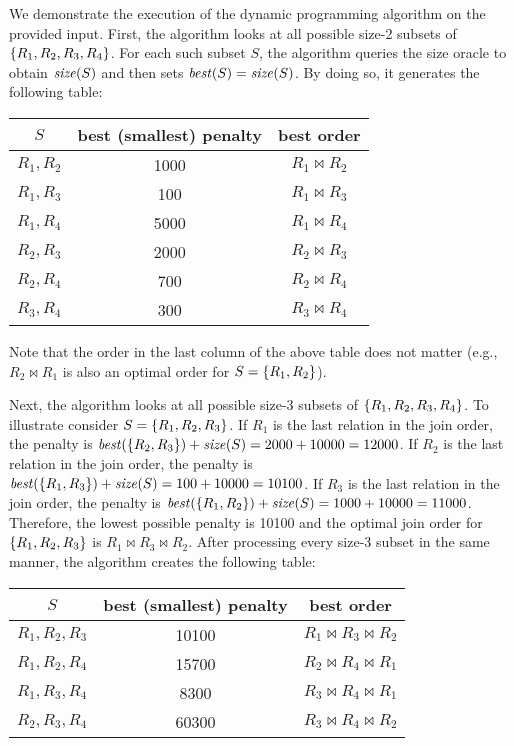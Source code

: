 \begin{sol}
     We demonstrate the execution of the dynamic programming algorithm on the provided input. First, the algorithm looks at all possible size-2 subsets of $\{R_1, R_2, R_3, R_4\}$. For each such subset $S$, the algorithm queries the size oracle to obtain $\mathit{size}(S)$ and then sets $\mathit{best}(S) = \mathit{size}(S)$. By doing so, it generates the following table:

    \begin{center}
    \begin{tabular}{c|c|c}
        $S$ & best (smallest) penalty & best order\\
        \hline
        $R_1,R_2$ & 1000 & $R_1 \bowtie R_2$ \\
        $R_1,R_3$ & 100 & $R_1 \bowtie R_3$\\
        $R_1,R_4$ & 5000 & $R_1 \bowtie R_4$\\
        $R_2,R_3$ & 2000 & $R_2 \bowtie R_3$\\
        $R_2,R_4$ & 700 & $R_2 \bowtie R_4$\\
        $R_3,R_4$ & 300 & $R_3 \bowtie R_4$
    \end{tabular}
    \end{center}

    \noindent Note that the order in the last column of the above table does not matter (e.g., $R_2 \bowtie R_1$ is also an optimal order for $S = \{R_1, R_2\}$).

    \vgap

    Next, the algorithm looks at all possible size-3 subsets of $\{R_1, R_2, R_3, R_4\}$. To illustrate consider $S = \{R_1, R_2, R_3\}$. If $R_1$ is the last relation in the join order, the  penalty is $\mathit{best}(\{R_2, R_3\}) + \mathit{size}(S) = 2000 + 10000 = 12000$. If $R_2$ is the last relation in the join order, the penalty is $\mathit{best}(\{R_1, R_3\}) + \mathit{size}(S) = 100 + 10000 = 10100$. If $R_3$ is the last relation in the join order, the penalty is $\mathit{best}(\{R_1, R_2\}) + \mathit{size}(S) = 1000 + 10000 = 11000$. Therefore, the lowest possible penalty is 10100 and the optimal join order for $\{R_1, R_2, R_3\}$ is $R_1 \bowtie R_3 \bowtie R_2$. After processing every size-3 subset in the same manner, the algorithm creates the following table:

        \begin{center}
    \begin{tabular}{c|c|c}
        $S$ & best (smallest) penalty & best order\\
        \hline
        $R_1,R_2,R_3$ & 10100 & $R_1 \bowtie R_3 \bowtie R_2$ \\
        $R_1,R_2,R_4$ & 15700 & $R_2 \bowtie R_4 \bowtie R_1$\\
        $R_1,R_3,R_4$ & 8300 & $R_3 \bowtie R_4 \bowtie R_1$\\
        $R_2,R_3,R_4$ & 60300 & $R_3 \bowtie R_4 \bowtie R_2$
    \end{tabular}
    \end{center}


\end{sol}
